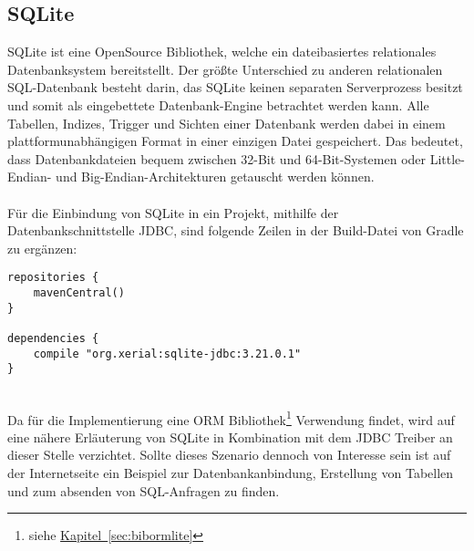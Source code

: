 \subsection{SQLite}\label{sec:bibsqlite}
SQLite ist eine OpenSource Bibliothek, welche ein dateibasiertes relationales Datenbanksystem bereitstellt. Der größte Unterschied zu anderen relationalen SQL-Datenbank besteht darin, das SQLite keinen separaten Serverprozess besitzt und somit als eingebettete Datenbank-Engine betrachtet werden kann. Alle Tabellen, Indizes, Trigger und Sichten einer Datenbank werden dabei in einem plattformunabhängigen Format in einer einzigen Datei gespeichert. Das bedeutet, dass Datenbankdateien bequem zwischen 32-Bit und 64-Bit-Systemen oder Little-Endian- und Big-Endian-Architekturen getauscht werden können. \cite{sqliteAbout}\\
\\
Für die Einbindung von SQLite in ein Projekt, mithilfe der Datenbankschnittstelle \gls{JDBC}, sind folgende Zeilen in der Build-Datei von Gradle zu ergänzen:
\\
\begin{lstlisting}[style=lstStyleFramed, language=Gradle, caption={Einbindung der Bibliothek SQLite mittels Gradle}, label=lst:sqlite, float]
repositories {
	mavenCentral()
}

dependencies {
	compile "org.xerial:sqlite-jdbc:3.21.0.1"
}
\end{lstlisting}
\\
Da für die Implementierung eine \gls{ORM} Bibliothek\footnote{siehe \hyperref[sec:bibormlite]{Kapitel~\ref{sec:bibormlite}}} Verwendung findet, wird auf eine nähere Erläuterung von SQLite in Kombination mit dem \gls{JDBC} Treiber an dieser Stelle verzichtet. Sollte dieses Szenario dennoch von Interesse sein ist auf der Internetseite \cite{sqliteJDBCTutorial} ein Beispiel zur Datenbankanbindung, Erstellung von Tabellen und zum absenden von SQL-Anfragen zu finden.

